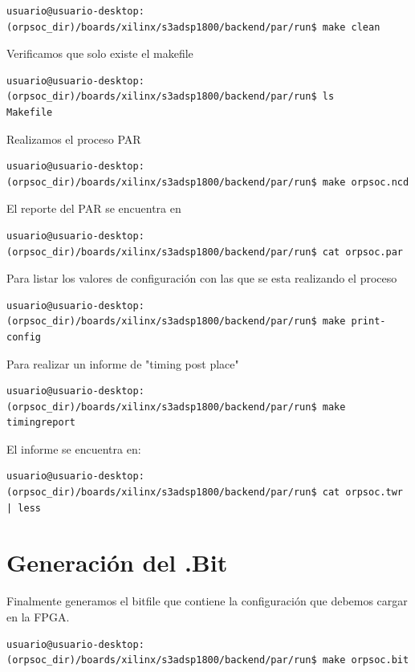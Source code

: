 \begin{lstlisting}[breaklines]
usuario@usuario-desktop:(orpsoc_dir)/boards/xilinx/s3adsp1800/backend/par/run$ make clean
\end{lstlisting}

Verificamos que solo existe el makefile
\begin{lstlisting}[breaklines]
usuario@usuario-desktop:(orpsoc_dir)/boards/xilinx/s3adsp1800/backend/par/run$ ls
Makefile
\end{lstlisting}

Realizamos el proceso PAR 

\begin{lstlisting}[breaklines]
usuario@usuario-desktop:(orpsoc_dir)/boards/xilinx/s3adsp1800/backend/par/run$ make orpsoc.ncd
\end{lstlisting}
El reporte del PAR se encuentra en 
\begin{lstlisting}[breaklines]
usuario@usuario-desktop:(orpsoc_dir)/boards/xilinx/s3adsp1800/backend/par/run$ cat orpsoc.par
\end{lstlisting}

Para listar los valores de configuración con las que se esta realizando el proceso
\begin{lstlisting}[breaklines]
usuario@usuario-desktop:(orpsoc_dir)/boards/xilinx/s3adsp1800/backend/par/run$ make print-config
\end{lstlisting}

Para realizar un informe de "timing post place" 

\begin{lstlisting}[breaklines]
usuario@usuario-desktop:(orpsoc_dir)/boards/xilinx/s3adsp1800/backend/par/run$ make timingreport
\end{lstlisting}

El informe se encuentra en:

\begin{lstlisting}[breaklines]
usuario@usuario-desktop:(orpsoc_dir)/boards/xilinx/s3adsp1800/backend/par/run$ cat orpsoc.twr | less
\end{lstlisting}


 \section{Generación del .Bit}

Finalmente generamos el bitfile que contiene la configuración que debemos cargar en la FPGA.

\begin{lstlisting}[breaklines]
usuario@usuario-desktop:(orpsoc_dir)/boards/xilinx/s3adsp1800/backend/par/run$ make orpsoc.bit
\end{lstlisting}

